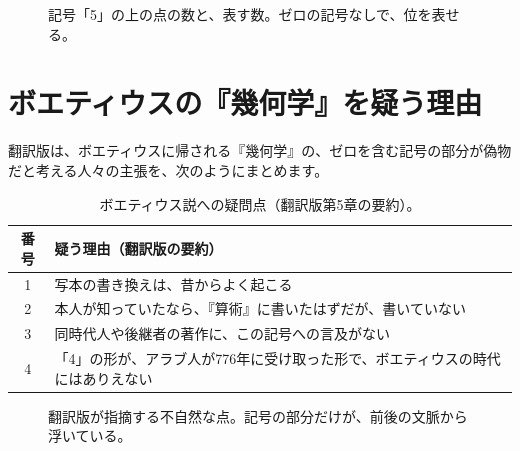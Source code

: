 \documentclass[a4paper,11pt,openany]{ltjsbook}
\begin{document}
\begin{figure}[htbp]
\centering
{}
\caption{記号「5」の上の点の数と、表す数。ゼロの記号なしで、位を表せる。}
\end{figure}

\section{ボエティウスの『幾何学』を疑う理由}

翻訳版は、ボエティウスに帰される『幾何学』の、ゼロを含む記号の部分が偽物だと考える人々の主張を、次のようにまとめます。

\begin{table}[htbp]
\centering
\begin{tabular}{cp{9cm}}
\toprule
番号 & 疑う理由（翻訳版の要約）\\
\midrule
1 & 写本の書き換えは、昔からよく起こる\\
2 & 本人が知っていたなら、『算術』に書いたはずだが、書いていない\\
3 & 同時代人や後継者の著作に、この記号への言及がない\\
4 & 「4」の形が、アラブ人が776年に受け取った形で、ボエティウスの時代にはありえない\\
\bottomrule
\end{tabular}
\caption{ボエティウス説への疑問点（翻訳版第5章の要約）。}
\end{table}

\begin{figure}[htbp]
\centering
{}
\caption{翻訳版が指摘する不自然な点。記号の部分だけが、前後の文脈から浮いている。}
\end{figure}
\end{document}
